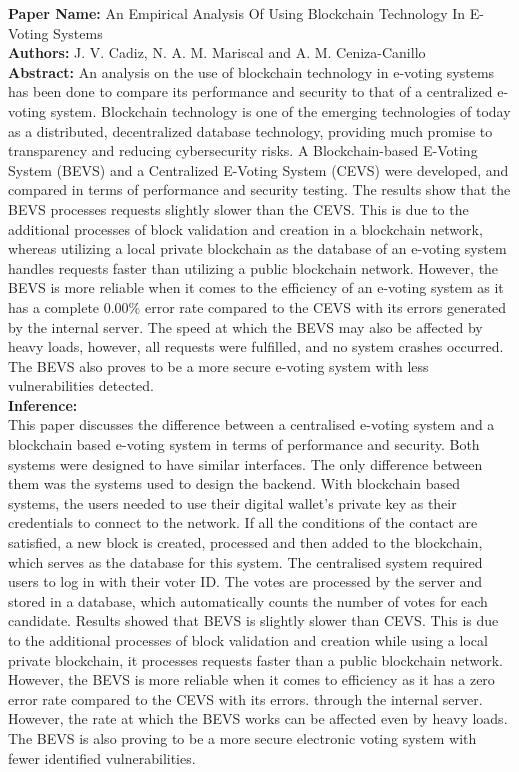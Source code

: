 \documentclass[oneside, 12pt]{book}
\begin{document}
\begin{enumerate}
	      \textbf{Paper Name:} An Empirical Analysis Of Using Blockchain Technology In E-Voting Systems \cite{cadiz2021empirical}\\
	      \textbf{Authors:} J. V. Cadiz, N. A. M. Mariscal and A. M. Ceniza-Canillo\\
	      \textbf{Abstract:} An analysis on the use of blockchain technology in e-voting systems has been done to compare its performance and security to that of a centralized e-voting system. Blockchain technology is one of the emerging technologies of today as a distributed, decentralized database technology, providing much promise to transparency and reducing cybersecurity risks. A Blockchain-based E-Voting System (BEVS) and a Centralized E-Voting System (CEVS) were developed, and compared in terms of performance and security testing. The results show that the BEVS processes requests slightly slower than the CEVS. This is due to the additional processes of block validation and creation in a blockchain network, whereas utilizing a local private blockchain as the database of an e-voting system handles requests faster than utilizing a public blockchain network. However, the BEVS is more reliable when it comes to the efficiency of an e-voting system as it has a complete 0.00\% error rate compared to the CEVS with its errors generated by the internal server. The speed at which the BEVS may also be affected by heavy loads, however, all requests were fulfilled, and no system crashes occurred. The BEVS also proves to be a more secure e-voting system with less vulnerabilities detected.\\
	      \textbf{Inference:}
	      \\This paper discusses the difference between a centralised e-voting system and a blockchain based e-voting system in terms of performance and security. Both systems were designed to have similar interfaces. The only difference between them was the systems used to design the backend. With blockchain based systems, the users needed to use their digital wallet's private key as their credentials to connect to the network. If all the conditions of the contact are satisfied, a new block is created, processed and then added to the blockchain, which serves as the database for this system. The centralised system required users to log in with their voter ID. The votes are processed by the server and stored in a database, which automatically counts the number of votes for each candidate.  Results showed that BEVS is slightly slower than CEVS. This is due to the additional processes of block validation and creation while using a local private blockchain, it processes requests faster than a public blockchain network.  However, the BEVS is more reliable when it comes to efficiency as it has a zero error rate compared to the CEVS with its errors. through the internal server. However, the rate at which the BEVS works can be affected even by heavy loads. The BEVS is also proving to be a more secure electronic voting system with fewer identified vulnerabilities.

\end{enumerate}
\end{document}
